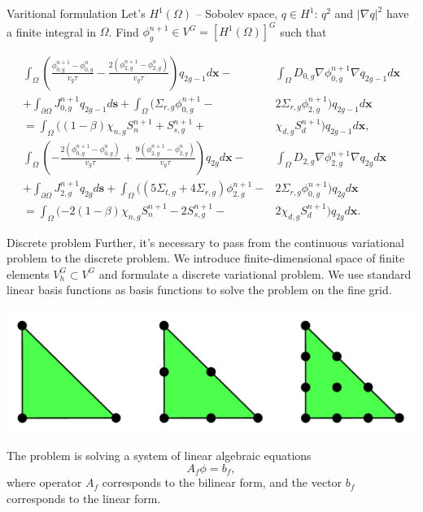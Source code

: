\documentclass[10pt,pdf,hyperref={unicode}]{beamer}
\begin{document}
	\begin{frame}{Varitional formulation}
		Let's $H^1(\Omega)$ -- Sobolev space, $q \in H^1$: $q^2$ and $\vert\nabla q\vert^2$ have a finite integral in $\Omega$. 
		Find $\phi^{n+1}_g \in V^G = [H^1(\Omega)]^G$ such that		
		\begin{small}
		\[
		\begin{split}
			\int_{\Omega} 
				\left( 
					\frac{\phi^{n+1}_{0,g} - \phi^{n}_{0,g}}{v_g \tau} -
					\frac{2(\phi^{n+1}_{2,g} - \phi^{n}_{2,g})}{v_g \tau} 
				\right) q_{2g-1} d\bm{x} - & %
			\int_{\Omega} D_{0,g} \nabla \phi^{n+1}_{0,g} \nabla q_{2g-1} d\bm{x} \\
			+ \int_{\partial\Omega} J^{n+1}_{0,g} q_{2g-1} d\bm{s} +
			\int_{\Omega}
				(
					\Sigma_{r,g} \phi^{n+1}_{0,g} - & %
					2\Sigma_{r,g} \phi^{n+1}_{2,g} 
				) q_{2g-1} d\bm{x} \\
			= \int_{\Omega} 
				(
					(1 - \beta) \chi_{n,g} S^{n+1}_{n} + 
					S^{n+1}_{s,g} + & %
					\chi_{d,g} S^{n+1}_d 
				) q_{2g-1} d\bm{x}, \\
			\int_{\Omega} 
				\left( 
					- \frac{2(\phi^{n+1}_{0,g} - \phi^{n}_{0,g})}{v_g \tau} + 
					\frac{9(\phi^{n+1}_{2,g} - \phi^{n}_{2,g})}{v_g \tau} 
				\right) q_{2g} d\bm{x} - & %
			\int_{\Omega} D_{2,g} \nabla \phi^{n+1}_{2,g} \nabla  q_{2g} d\bm{x} \\
			+ \int_{\partial\Omega} J^{n+1}_{2,g} q_{2g} d\bm{s} + 
			\int_{\Omega} 
				( 
					(5 \Sigma_{t,g} + 
					4 \Sigma_{r,g}) \phi^{n+1}_{2,g} - & %
					2\Sigma_{r,g} \phi^{n+1}_{0,g} 
				) q_{2g} d\bm{x} \\
			= \int_{\Omega}
				( 
					- 2(1 - \beta) \chi_{n,g} S^{n+1}_{n} - 
					2S^{n+1}_{s,g} - & %
					2\chi_{d,g} S^{n+1}_d 
				) q_{2g} d\bm{x}.
		\end{split}
		\]
		\end{small}
	\end{frame}

	\begin{frame}{Discrete problem}
		Further, it's necessary to pass from the continuous variational problem to the discrete problem.
		We introduce finite-dimensional space of finite elements $V^G_h \subset V^G$ and formulate a discrete variational problem.
		We use standard linear basis functions as basis functions to solve the problem on the fine grid.
		\begin{center}
			\includegraphics[width=0.4\linewidth] {triangle.png}
		\end{center}
		
		The problem is solving a system of linear algebraic equations
		\[
			A_f \phi = b_f,
		\]
		where operator $A_f$ corresponds to the bilinear form, and the vector $b_f$ corresponds to the linear form.
	\end{frame}
\end{document}
